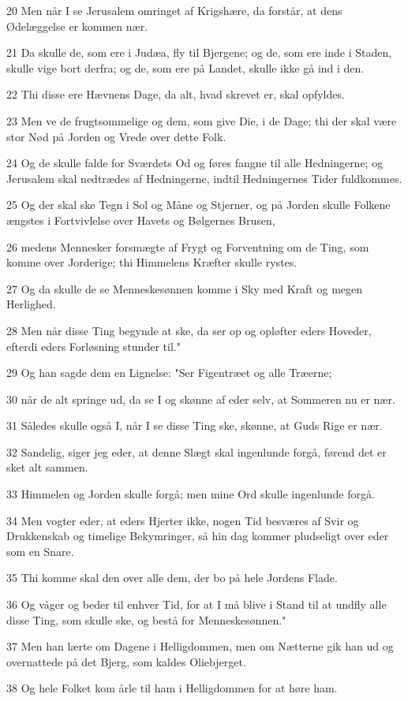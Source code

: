\par 20 Men når I se Jerusalem omringet af Krigshære, da forstår, at dens Ødelæggelse er kommen nær.
\par 21 Da skulle de, som ere i Judæa, fly til Bjergene; og de, som ere inde i Staden, skulle vige bort derfra; og de, som ere på Landet, skulle ikke gå ind i den.
\par 22 Thi disse ere Hævnens Dage, da alt, hvad skrevet er, skal opfyldes.
\par 23 Men ve de frugtsommelige og dem, som give Die, i de Dage; thi der skal være stor Nød på Jorden og Vrede over dette Folk.
\par 24 Og de skulle falde for Sværdets Od og føres fangne til alle Hedningerne; og Jerusalem skal nedtrædes af Hedningerne, indtil Hedningernes Tider fuldkommes.
\par 25 Og der skal ske Tegn i Sol og Måne og Stjerner, og på Jorden skulle Folkene ængstes i Fortvivlelse over Havets og Bølgernes Brusen,
\par 26 medens Mennesker forsmægte af Frygt og Forventning om de Ting, som komme over Jorderige; thi Himmelens Kræfter skulle rystes.
\par 27 Og da skulle de se Menneskesønnen komme i Sky med Kraft og megen Herlighed.
\par 28 Men når disse Ting begynde at ske, da ser op og opløfter eders Hoveder, efterdi eders Forløsning stunder til."
\par 29 Og han sagde dem en Lignelse: "Ser Figentræet og alle Træerne;
\par 30 når de alt springe ud, da se I og skønne af eder selv, at Sommeren nu er nær.
\par 31 Således skulle også I, når I se disse Ting ske, skønne, at Guds Rige er nær.
\par 32 Sandelig, siger jeg eder, at denne Slægt skal ingenlunde forgå, førend det er sket alt sammen.
\par 33 Himmelen og Jorden skulle forgå; men mine Ord skulle ingenlunde forgå.
\par 34 Men vogter eder, at eders Hjerter ikke, nogen Tid besværes af Svir og Drukkenskab og timelige Bekymringer, så hin dag kommer pludseligt over eder som en Snare.
\par 35 Thi komme skal den over alle dem, der bo på hele Jordens Flade.
\par 36 Og våger og beder til enhver Tid, for at I må blive i Stand til at undfly alle disse Ting, som skulle ske, og bestå for Menneskesønnen."
\par 37 Men han lærte om Dagene i Helligdommen, men om Nætterne gik han ud og overnattede på det Bjerg, som kaldes Oliebjerget.
\par 38 Og hele Folket kom årle til ham i Helligdommen for at høre ham.

